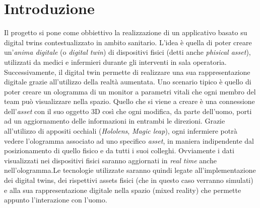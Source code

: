 \documentclass{report}
\begin{document}
\chapter{Introduzione}
Il progetto si pone come obbiettivo la realizzazione di un applicativo basato su digital twins contestualizzato in ambito sanitario. L'idea è quella di poter creare un'\textit{anima digitale} (o \textit{digital twin}) di dispositivi fisici (detti anche \textit{phisical asset}), utilizzati da medici e infermieri durante gli interventi in sala operatoria. Successivamente, il digital twin permette di realizzare una sua rappresentazione digitale grazie all'utilizzo della realtà aumentata. Uno scenario tipico è quello di poter creare un ologramma di un monitor a parametri vitali che ogni membro del team può visualizzare nella spazio. Quello che si viene a creare è una connessione dell'\textit{asset} con il suo oggetto 3D così che ogni modifica, da parte dell'uomo, porti ad un aggiornamento delle informazioni in entrambi le direzioni. Grazie all'utilizzo di appositi occhiali (\textit{Hololens}, \textit{Magic leap}), ogni infermiere potrà vedere l'ologramma associato ad uno specifico \textit{asset}, in maniera indipendente dal posizionamento di quello fisico e da tutti i suoi colleghi. Ovviamente i dati visualizzati nei dispositivi fisici saranno aggiornati in \textit{real time} anche nell'ologramma.\newline \newline Le tecnologie utilizzate saranno quindi legate all'implementazione dei digital twins, dei rispettivi assets fisici (che in questo caso verranno simulati) e alla sua rappresentazione digitale nella spazio (mixed reality) che permette appunto l'interazione con l'uomo.
\end{document}
